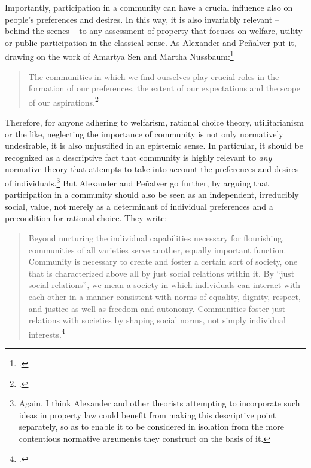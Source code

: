 \documentclass[12pt,a4paper]{book} %
\begin{document}
Importantly, participation in a community can have a crucial influence also on people's preferences and desires. In this way, it is also invariably relevant -- behind the scenes -- to any assessment of property that focuses on welfare, utility or public participation in the classical sense. As Alexander and Pe\~{n}alver put it, drawing on the work of Amartya Sen and Martha Nussbaum:\footcite{sen84,sen85,sen99,nussbaum00,nussbaum02}
\begin{quote}
The communities in which we find ourselves play crucial roles in the formation of our preferences, the extent of our expectations and the scope of our aspirations.\footcite[140]{alexander09}
\end{quote}
Therefore, for anyone adhering to welfarism, rational choice theory, utilitarianism or the like, neglecting the importance of community is not only normatively undesirable, it is also unjustified in an epistemic sense. In particular, it should be recognized as a descriptive fact that community is highly relevant to {\it any} normative theory that attempts to take into account the preferences and desires of individuals.\footnote{Again, I think Alexander and other theorists attempting to incorporate such ideas in property law could benefit from making this descriptive point separately, so as to enable it to be considered in isolation from the more contentious normative arguments they construct on the basis of it.} But Alexander and Pe\~{n}alver go further, by arguing that participation in a community should also be seen as an independent, irreducibly social, value, not merely as a determinant of individual preferences and a precondition for rational choice. They write:

\begin{quote}
Beyond nurturing the individual capabilities necessary for flourishing, communities of all varieties serve another, equally important function. Community is necessary to create and foster a certain sort of society, one that is characterized above all by just social relations within it. By ``just social relations'', we mean a society in which individuals can interact with each other in a manner consistent with norms of equality, dignity, respect, and justice as well as freedom and autonomy. Communities foster just relations with societies by shaping social norms, not simply individual interests.\footcite[140]{alexander09}
\end{quote}
\end{document}
